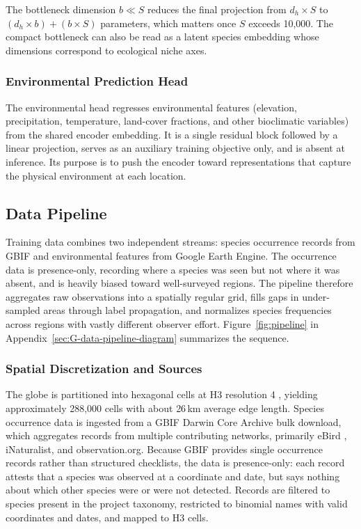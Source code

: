 The bottleneck dimension $b \ll S$ reduces the final projection from $d_h \times S$ to $(d_h \times b) + (b \times S)$ parameters, which matters once $S$ exceeds 10,000. The compact bottleneck can also be read as a latent species embedding whose dimensions correspond to ecological niche axes.

\subsubsection{Environmental Prediction Head}
\label{sec:env-head}

The environmental head regresses environmental features (elevation, precipitation, temperature, land-cover fractions, and other bioclimatic variables) from the shared encoder embedding. It is a single residual block followed by a linear projection, serves as an auxiliary training objective only, and is absent at inference. Its purpose is to push the encoder toward representations that capture the physical environment at each location.

\subsection{Data Pipeline}
\label{sec:data}

Training data combines two independent streams: species occurrence records from GBIF and environmental features from Google Earth Engine. The occurrence data is presence-only, recording where a species was seen but not where it was absent, and is heavily biased toward well-surveyed regions. The pipeline therefore aggregates raw observations into a spatially regular grid, fills gaps in under-sampled areas through label propagation, and normalizes species frequencies across regions with vastly different observer effort. Figure~\ref{fig:pipeline} in Appendix~\ref{sec:G-data-pipeline-diagram} summarizes the sequence.

\subsubsection{Spatial Discretization and Sources}
\label{sec:sources}

The globe is partitioned into hexagonal cells at H3 resolution 4 \citep{uberh3}, yielding approximately 288,000 cells with about 26\,km average edge length. Species occurrence data is ingested from a GBIF Darwin Core Archive bulk download, which aggregates records from multiple contributing networks, primarily eBird \citep{sullivan2009ebird}, iNaturalist, and observation.org. Because GBIF provides single occurrence records rather than structured checklists, the data is presence-only: each record attests that a species was observed at a coordinate and date, but says nothing about which other species were or were not detected. Records are filtered to species present in the project taxonomy, restricted to binomial names with valid coordinates and dates, and mapped to H3 cells.

